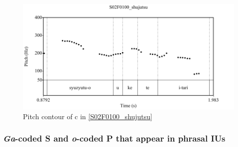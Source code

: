 \begin{figure}
	\begin{center}
	\includegraphics[width=.6\textwidth]{sounds/S02F0100_shujutsu.pdf}
	\caption{Pitch contour of c in \ref{S02F0100_shujutsu}}
	\label{S02F0100_shujutsuF}
	\end{center}
\end{figure}


\subsubsection{\textit{Ga}-coded S and \textit{o}-coded P that appear in phrasal IUs}\label{Int:Cor:Focus:PIU}


